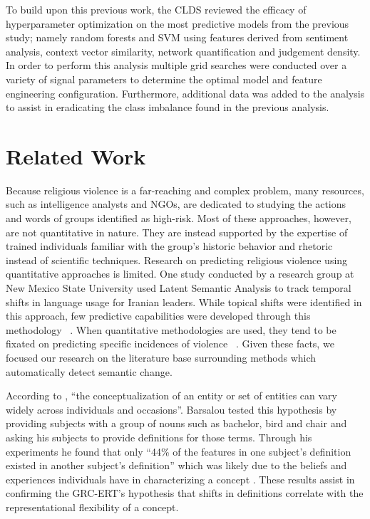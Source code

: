\documentclass[11pt]{article}
\begin{document}
To build upon this previous work, the CLDS reviewed the efficacy of hyperparameter optimization on the most predictive models from the previous study; namely random forests and SVM using features derived from sentiment analysis, context vector similarity, network quantification and judgement density. In order to perform this analysis multiple grid searches were conducted over a variety of signal parameters to determine the optimal model and feature engineering configuration. Furthermore, additional data was added to the analysis to assist in eradicating the class imbalance found in the previous analysis.

\section{Related Work}\label{relatedwork}

Because religious violence is a far-reaching and complex problem, many resources, such as intelligence analysts and NGOs, are dedicated to studying the actions and words of groups identified as high-risk. Most of these approaches, however, are not quantitative in nature. They are instead supported by the expertise of trained individuals familiar with the group’s historic behavior and rhetoric instead of scientific techniques. Research on predicting religious violence using quantitative approaches is limited. One study conducted by a research group at New Mexico State University used Latent Semantic Analysis to track temporal shifts in language usage for Iranian leaders. While topical shifts were identified in this approach, few predictive capabilities were developed through this methodology ~\cite{Hacker2013}. When quantitative methodologies are used, they tend to be fixated on predicting specific incidences of violence ~\cite{Yang2010}. Given these facts, we focused our research on the literature base surrounding methods which automatically detect semantic change. 

According to , “the conceptualization of an entity or set of entities can vary widely across individuals and occasions”. Barsalou tested this hypothesis by providing subjects with a group of nouns such as bachelor, bird and chair and asking his subjects to provide definitions for those terms. Through his experiments he found that only “44\% of the features in one subject’s definition existed in another subject’s definition” which was likely due to the beliefs and experiences individuals have in characterizing a concept \cite{Barsalou1993}. These results assist in confirming the GRC-ERT’s hypothesis that shifts in definitions correlate with the representational flexibility of a concept.
\end{document}
